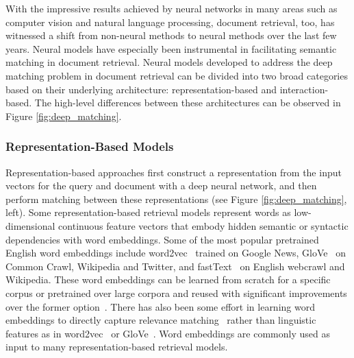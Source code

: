 With the impressive results achieved by neural networks in many areas such as computer vision and natural language processing, document retrieval, too, has witnessed a shift from non-neural methods to neural methods over the last few years.
Neural models have especially been instrumental in facilitating semantic matching in document retrieval.
Neural models developed to address the deep matching problem in document retrieval can be divided into two broad categories based on their underlying architecture: representation-based and interaction-based.
The high-level differences between these architectures can be observed in Figure \ref{fig:deep_matching}.

\subsubsection{Representation-Based Models}

Representation-based approaches first construct a representation from the input vectors for the query and document with a deep neural network, and then perform matching between these representations (see  Figure \ref{fig:deep_matching}, left).
Some representation-based retrieval models represent words as low-dimensional continuous feature vectors that embody hidden semantic or syntactic dependencies with word embeddings.
Some of the most popular pretrained English word embeddings include word2vec~\cite{mikolov2013distributed} trained on  Google News, GloVe~\cite{pennington2014glove} on Common Crawl, Wikipedia and Twitter, and fastText~\cite{bojanowski2017enriching} on English webcrawl and Wikipedia.
These word embeddings can be learned from scratch for a specific corpus or pretrained over large corpora and reused with significant improvements over the former option~\cite{turian2010word}.
There has also been some effort in learning word embeddings to directly capture relevance matching~\cite{DBLP:journals/corr/ZamaniC17, ganguly2015word} rather than linguistic features as in word2vec~\cite{mikolov2013distributed} or GloVe~\cite{pennington2014glove}.
Word embeddings are commonly used as input to many representation-based retrieval models.

